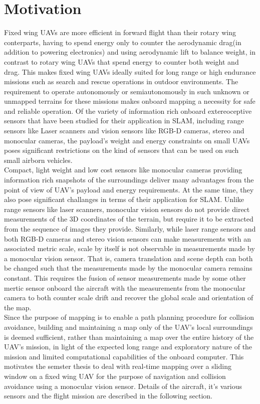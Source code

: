\section{Motivation}
\label{sec:intro_motivation}
Fixed wing UAVs are more efficient in forward flight than their rotary wing conterparts, having to spend energy only to counter the aerodynamic drag(in addition to powering electronics) and using aerodynamic lift to balance weight, in contrast to rotary wing UAVs that spend energy to counter both weight and drag. This makes fixed wing UAVs ideally suited for long range or high endurance missions such as search and rescue operations in outdoor environments. The requirement to operate autonomously or semiautonomously in such unknown or unmapped terrains for these missions makes onboard mapping a necessity for safe and reliable operation. Of the variety of information rich onboard extereoceptive sensors that have been studied for their application in SLAM, including range sensors like Laser scanners and vision sensors like RGB-D cameras, stereo and monocular cameras, the payload's weight and energy constraints on small UAVs poses significant restrictions on the kind of sensors that can be used on such small airborn vehicles.\\ 
Compact, light weight and low cost sensors like monocular cameras providing information rich snapshots of the surroundings deliver many advantages from the point of view of UAV's payload and energy requirements. At the same time, they also pose significant challanges in terms of their application for SLAM. Unlike range sensors like laser scanners, monocular vision sensors do not provide direct measurements of the 3D coordinates of the terrain, but require it to be extracted from the sequence of images they provide. Similarly, while laser range sensors and both RGB-D cameras and stereo vision sensors can make measurements with an associated metric scale, scale by itself is not observable in measurements made by a monocular vision sensor. That is, camera translation and scene depth can both be changed such that the measurements made by the monocular camera remains constant. This requires the fusion of sensor measurements made by some other mertic sensor onboard the aircraft with the measurements from the monocular camera to both counter scale drift and recover the global scale and orientation of the map.\\
Since the purpose of mapping is to enable a path planning procedure for collision avoidance, building and maintaining a map only of the UAV's local surroundings is deemed sufficient, rather than maintaining a map over the entire history of the UAV's mission, in light of the expected long range and exploratory nature of the mission and limited computational capabilities of the onboard computer. This motivates the semster thesis to deal with real-time mapping over a sliding window on a fixed wing UAV for the purpose of navigation and collision avoidance using a monocular vision sensor. Details of the aircraft, it's various sensors and the flight mission are described in the following section.

